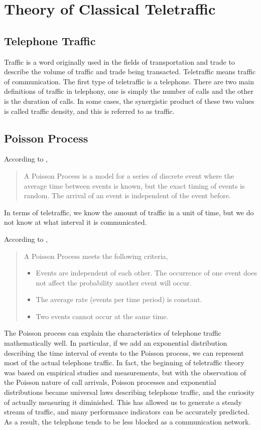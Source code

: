 \chapter{Theory of Classical Teletraffic}
\label{theory_of_classical_teletraffic}
\section{Telephone Traffic}
Traffic is a word originally used in the fields of transportation and trade to describe the volume of traffic and trade being transacted.
Teletraffic means traffic of communication.
The first type of teletraffic is a telephone.
There are two main definitions of traffic in telephony, one is simply the number of calls and the other is the duration of calls.
In some cases, the synergistic product of these two values is called traffic density, and this is referred to as traffic\cite{teletraffic1954}.

\section{Poisson Process}
According to \cite{poisson},
\begin{quote}
A Poisson Process is a model for a series of discrete event where the average time between events is known, but the exact timing of events is random.
The arrival of an event is independent of the event before.
\end{quote}
In terms of teletraffic, we know the amount of traffic in a unit of time, but we do not know at what interval it is communicated.

According to \cite{poisson},
\begin{quote}
A Poisson Process meets the following criteria,
\begin{itemize}
    \item Events are independent of each other. The occurrence of one event does not affect the probability another event will occur.
    \item The average rate (events per time period) is constant.
    \item Two events cannot occur at the same time.
\end{itemize}
\end{quote}

The Poisson process can explain the characteristics of telephone traffic mathematically well.
In particular, if we add an exponential distribution describing the time interval of events to the Poisson process, we can represent most of the actual telephone traffic.
In fact, the beginning of teletraffic theory was based on empirical studies and measurements, but with the observation of the Poisson nature of call arrivals, Poisson processes and exponential distributions became universal laws describing telephone traffic, and the curiosity of actually measuring it diminished.
This has allowed us to generate a steady stream of traffic, and many performance indicators can be accurately predicted. As a result, the telephone tends to be less blocked as a communication network.\cite{willinger1998mathematics}

